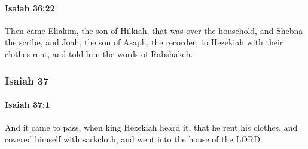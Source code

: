 		\paragraph{Isaiah 36:22} %
			\label{ISAIAH-36-22}

			Then came Eliakim, the son of Hilkiah, that was over the household, and Shebna the scribe, and Joah, the son of Asaph, the recorder, to Hezekiah with their clothes rent, and told him the words of Rabshakeh.

	\subsubsection{Isaiah 37} %
		\label{ISAIAH-37}

		\paragraph{Isaiah 37:1} %
			\label{ISAIAH-37-1}

			And it came to pass, when king Hezekiah heard it, that he rent his clothes, and covered himself with sackcloth, and went into the house of the LORD.

